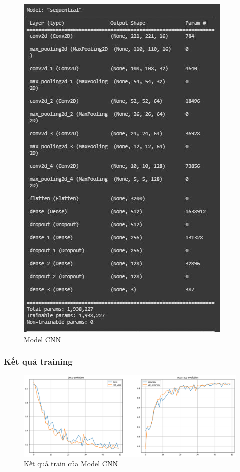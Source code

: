 \begin{center}
    \begin{figure}[!h]
        \centering
        \includegraphics[scale = 1.2]{fileanh/13.jpg}
        \caption{Model CNN}
    \end{figure}
\end{center}
\subsubsection{Kết quả training}
\begin{center}
    \begin{figure}[!h]
        \centering
        \includegraphics[scale = 0.38]{fileanh/17.png}
        \caption{Kết quả train của Model CNN}
    \end{figure}
\end{center}
